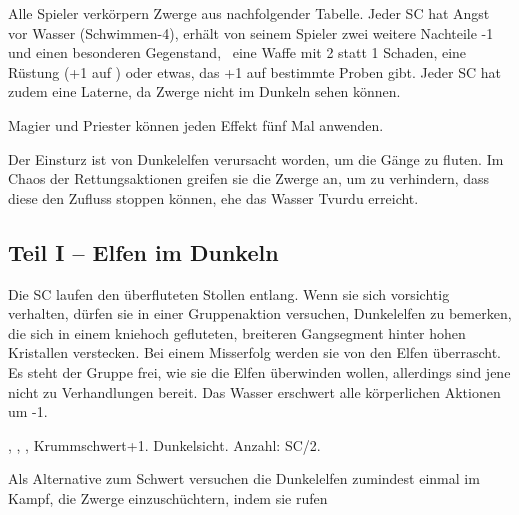 {	

		\noindent
		Alle Spieler verkörpern Zwerge aus nachfolgender Tabelle. Jeder SC hat Angst vor Wasser (Schwim\-men-4), erhält von seinem Spieler zwei weitere Nachteile -1 und einen besonderen Gegenstand, \zB\ eine Waffe mit 2 statt 1 Schaden, eine Rüstung (+1 auf \RD) oder etwas, das +1 auf bestimmte Proben gibt. Jeder SC hat zudem eine Laterne, da Zwerge nicht im Dunkeln sehen können.


		\noindent
		Magier und Priester können jeden Effekt fünf Mal anwenden.


		\noindent
		Der Einsturz ist von Dunkelelfen verursacht worden, um die Gänge zu fluten. Im Chaos der Rettungsaktionen greifen sie die Zwerge an, um zu verhindern, dass diese den Zufluss stoppen können, ehe das Wasser Tvurdu erreicht.

		\subsection{Teil I -- Elfen im Dunkeln}

		\noindent
		Die SC laufen den überfluteten Stollen entlang. Wenn sie sich vorsichtig verhalten, dürfen sie in einer Gruppenaktion versuchen, Dunkelelfen zu bemerken, die sich in einem kniehoch gefluteten, breiteren Gangsegment hinter hohen Kristallen verstecken. Bei einem Misserfolg werden sie von den Elfen überrascht. Es steht der Gruppe frei, wie sie die Elfen überwinden wollen, allerdings sind jene nicht zu Verhandlungen bereit. Das Wasser erschwert alle körperlichen Aktionen um -1.

		 , , , Krummschwert+1. Dunkelsicht. Anzahl: SC/2.

		Als Alternative zum Schwert versuchen die Dunkelelfen zumindest einmal im Kampf, die Zwerge einzuschüchtern, indem sie rufen 

}
